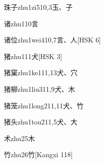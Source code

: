 \begin{EntryWithPhonetic}{珠子}{zhu1zi5}{10,3}{⽟、⼦}
\end{EntryWithPhonetic}

\begin{EntryWithPhonetic}{诸}{zhu1}{10}{⾔}
\end{EntryWithPhonetic}

\begin{EntryWithPhonetic}{诸位}{zhu1wei4}{10,7}{⾔、⼈}[HSK 6]
\end{EntryWithPhonetic}

\begin{EntryWithPhonetic}{猪}{zhu1}{11}{⽝}[HSK 3]
\end{EntryWithPhonetic}

\begin{EntryWithPhonetic}{猪窠}{zhu1ke1}{11,13}{⽝、⽳}
\end{EntryWithPhonetic}

\begin{EntryWithPhonetic}{猪柳}{zhu1liu3}{11,9}{⽝、⽊}
\end{EntryWithPhonetic}

\begin{EntryWithPhonetic}{猪笼}{zhu1long2}{11,11}{⽝、⽵}
\end{EntryWithPhonetic}

\begin{EntryWithPhonetic}{猪头}{zhu1tou2}{11,5}{⽝、⼤}
\end{EntryWithPhonetic}

\begin{EntryWithPhonetic}{术}{zhu2}{5}{⽊}
\end{EntryWithPhonetic}

\begin{EntryWithPhonetic}{竹}{zhu2}{6}{⽵}[Kangxi 118]
\end{EntryWithPhonetic}

